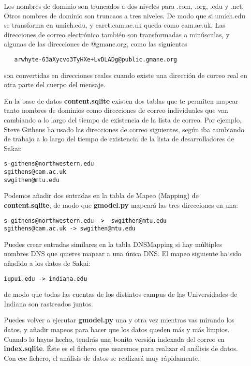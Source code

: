 Los nombres de dominio son truncados a dos niveles para .com, .org, .edu y .net.
Otros nombres de dominio son truncaos a tres niveles. De modo que si.umich.edu se transforma en
umich.edu, y caret.cam.ac.uk queda como cam.ac.uk. Las direcciones de correo electrónico también
son transformadas a minúsculas, y algunas de las direcciones de @gmane.org, como las siguientes

\beforeverb
\begin{verbatim}
   arwhyte-63aXycvo3TyHXe+LvDLADg@public.gmane.org
\end{verbatim}
\afterverb
%
son convertidas en direcciones reales cuando existe una dirección de correo real
en otra parte del cuerpo del mensaje.

En la base de datos {\bf content.sqlite} existen dos tablas que te permiten
mapear tanto nombres de dominios como direcciones de correo individuales que van cambiando
a lo largo del tiempo de existencia de la lista de correo. Por ejemplo, Steve Githens ha usado las
direcciones de correo siguientes, según iba cambiando de trabajo a lo largo del tiempo de existencia
de la lista de desarrolladores de Sakai:

\beforeverb
\begin{verbatim}
s-githens@northwestern.edu
sgithens@cam.ac.uk
swgithen@mtu.edu
\end{verbatim}
\afterverb
%
Podemos añadir dos entradas en la tabla de Mapeo (Mapping) de {\bf content.sqlite}, de modo
que {\bf gmodel.py} mapeará las tres direcciones en una:

\beforeverb
\begin{verbatim}
s-githens@northwestern.edu ->  swgithen@mtu.edu
sgithens@cam.ac.uk -> swgithen@mtu.edu
\end{verbatim}
\afterverb
%
Puedes crear entradas similares en la tabla DNSMapping si hay múltiples nombres
DNS que quieres mapear a una única DNS. El mapeo siguiente ha sido añadido a los datos de Sakai:

\beforeverb
\begin{verbatim}
iupui.edu -> indiana.edu
\end{verbatim}
\afterverb
%
de modo que todas las cuentas de los distintos campus de las Universidades de Indiana son
rastreados juntos.

Puedes volver a ejecutar {\bf gmodel.py} una y otra vez mientras vas mirando los datos, y añadir
mapeos para hacer que los datos queden más y más limpios. Cuando lo hayas hecho, tendrás una bonita
versión indexada del correo en {\bf index.sqlite}. Éste es el fichero que usaremos para realizar
el análisis de datos. Con ese fichero, el análisis de datos se realizará muy rápidamente.


